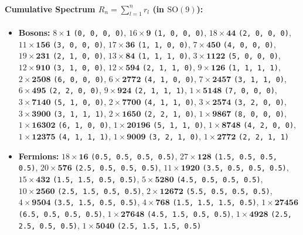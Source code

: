 \documentclass[11pt,a4paper]{article}
\begin{document}
\paragraph{Cumulative Spectrum $R_n = \sum_{l=1}^n r_l$ (in $\mathrm{SO}(9)$):}
\begin{itemize}
    \item \textbf{Bosons:} $8 \times \mathbf{1}$ \texttt{(0, 0, 0, 0)}, $16 \times \mathbf{9}$ \texttt{(1, 0, 0, 0)}, $18 \times \mathbf{44}$ \texttt{(2, 0, 0, 0)}, $11 \times \mathbf{156}$ \texttt{(3, 0, 0, 0)}, $17 \times \mathbf{36}$ \texttt{(1, 1, 0, 0)}, $7 \times \mathbf{450}$ \texttt{(4, 0, 0, 0)}, $19 \times \mathbf{231}$ \texttt{(2, 1, 0, 0)}, $13 \times \mathbf{84}$ \texttt{(1, 1, 1, 0)}, $3 \times \mathbf{1122}$ \texttt{(5, 0, 0, 0)}, $12 \times \mathbf{910}$ \texttt{(3, 1, 0, 0)}, $12 \times \mathbf{594}$ \texttt{(2, 1, 1, 0)}, $9 \times \mathbf{126}$ \texttt{(1, 1, 1, 1)}, $2 \times \mathbf{2508}$ \texttt{(6, 0, 0, 0)}, $6 \times \mathbf{2772}$ \texttt{(4, 1, 0, 0)}, $7 \times \mathbf{2457}$ \texttt{(3, 1, 1, 0)}, $6 \times \mathbf{495}$ \texttt{(2, 2, 0, 0)}, $9 \times \mathbf{924}$ \texttt{(2, 1, 1, 1)}, $1 \times \mathbf{5148}$ \texttt{(7, 0, 0, 0)}, $3 \times \mathbf{7140}$ \texttt{(5, 1, 0, 0)}, $2 \times \mathbf{7700}$ \texttt{(4, 1, 1, 0)}, $3 \times \mathbf{2574}$ \texttt{(3, 2, 0, 0)}, $3 \times \mathbf{3900}$ \texttt{(3, 1, 1, 1)}, $2 \times \mathbf{1650}$ \texttt{(2, 2, 1, 0)}, $1 \times \mathbf{9867}$ \texttt{(8, 0, 0, 0)}, $1 \times \mathbf{16302}$ \texttt{(6, 1, 0, 0)}, $1 \times \mathbf{20196}$ \texttt{(5, 1, 1, 0)}, $1 \times \mathbf{8748}$ \texttt{(4, 2, 0, 0)}, $1 \times \mathbf{12375}$ \texttt{(4, 1, 1, 1)}, $1 \times \mathbf{9009}$ \texttt{(3, 2, 1, 0)}, $1 \times \mathbf{2772}$ \texttt{(2, 2, 1, 1)}
    \item \textbf{Fermions:} $18 \times \mathbf{16}$ \texttt{(0.5, 0.5, 0.5, 0.5)}, $27 \times \mathbf{128}$ \texttt{(1.5, 0.5, 0.5, 0.5)}, $20 \times \mathbf{576}$ \texttt{(2.5, 0.5, 0.5, 0.5)}, $11 \times \mathbf{1920}$ \texttt{(3.5, 0.5, 0.5, 0.5)}, $15 \times \mathbf{432}$ \texttt{(1.5, 1.5, 0.5, 0.5)}, $5 \times \mathbf{5280}$ \texttt{(4.5, 0.5, 0.5, 0.5)}, $10 \times \mathbf{2560}$ \texttt{(2.5, 1.5, 0.5, 0.5)}, $2 \times \mathbf{12672}$ \texttt{(5.5, 0.5, 0.5, 0.5)}, $4 \times \mathbf{9504}$ \texttt{(3.5, 1.5, 0.5, 0.5)}, $4 \times \mathbf{768}$ \texttt{(1.5, 1.5, 1.5, 0.5)}, $1 \times \mathbf{27456}$ \texttt{(6.5, 0.5, 0.5, 0.5)}, $1 \times \mathbf{27648}$ \texttt{(4.5, 1.5, 0.5, 0.5)}, $1 \times \mathbf{4928}$ \texttt{(2.5, 2.5, 0.5, 0.5)}, $1 \times \mathbf{5040}$ \texttt{(2.5, 1.5, 1.5, 0.5)}
\end{itemize}
\end{document}
